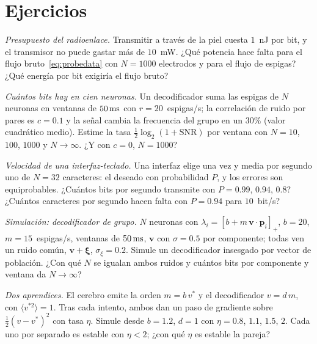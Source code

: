 \section{Ejercicios}

\begin{exercise}[\lvlA]
\label{ex:17:1}
\emph{Presupuesto del radioenlace.} Transmitir a través de la piel cuesta $1$~nJ por bit, y el transmisor no puede gastar más de $10$~mW. ¿Qué potencia hace falta para el flujo bruto~\eqref{eq:probedata} con $N=1000$ electrodos y para el flujo de espigas? ¿Qué energía por bit exigiría el flujo bruto?
\end{exercise}

\begin{exercise}[\lvlA]
\label{ex:17:2}
\emph{Cuántos bits hay en cien neuronas.} Un decodificador suma las espigas de $N$ neuronas en ventanas de $50\,\text{ms}$ con $r=20$~espigas/s; la correlación de ruido por pares es $c=0.1$ y la señal cambia la frecuencia del grupo en un $30\%$ (valor cuadrático medio). Estime la tasa $\tfrac12\log_2(1+\text{SNR})$ por ventana con $N=10$, $100$, $1000$ y $N\to\infty$. ¿Y con $c=0$, $N=1000$?
\end{exercise}

\begin{exercise}[\lvlB]
\label{ex:17:3}
\emph{Velocidad de una interfaz-teclado.} Una interfaz elige una vez y media por segundo uno de $N=32$ caracteres: el deseado con probabilidad $P$, y los errores son equiprobables. ¿Cuántos bits por segundo transmite con $P=0.99$, $0.94$, $0.8$? ¿Cuántos caracteres por segundo hacen falta con $P=0.94$ para $10$~bit/s?
\end{exercise}

\begin{exercise}[\lvlB]
\label{ex:17:4}
\emph{Simulación: decodificador de grupo.} $N$ neuronas con $\lambda_i=[b+m\,\mathbf v\cdot\mathbf p_i]_+$, $b=20$, $m=15$~espigas/s, ventanas de $50\,\text{ms}$, $\mathbf v$ con $\sigma=0.5$ por componente; todas ven un ruido común, $\mathbf v+\boldsymbol\xi$, $\sigma_\xi=0.2$. Simule un decodificador insesgado por vector de población. ¿Con qué $N$ se igualan ambos ruidos y cuántos bits por componente y ventana da $N\to\infty$?
\end{exercise}

\begin{exercise}[\lvlB]
\label{ex:17:5}
\emph{Dos aprendices.} El cerebro emite la orden $m=b\,v^*$ y el decodificador $v=d\,m$, con $\langle v^{*2}\rangle=1$. Tras cada intento, ambos dan un paso de gradiente sobre $\tfrac12(v-v^*)^2$ con tasa $\eta$. Simule desde $b=1.2$, $d=1$ con $\eta=0.8$, $1.1$, $1.5$, $2$. Cada uno por separado es estable con $\eta<2$; ¿con qué $\eta$ es estable la pareja?
\end{exercise}

